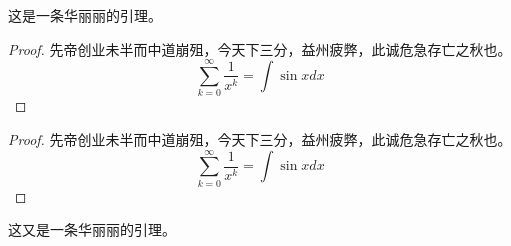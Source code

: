 \begin{lemma}
  这是一条华丽丽的引理。
\end{lemma}

\begin{proof}
先帝创业未半而中道崩殂，今天下三分，益州疲弊，此诚危急存亡之秋也。
\begin{equation}
  \sum_{k=0}^{\infty} \frac{1}{x^k} = \int \sin x dx
\end{equation}
\end{proof}

\begin{proof}
先帝创业未半而中道崩殂，今天下三分，益州疲弊，此诚危急存亡之秋也。
\begin{equation*}
  \sum_{k=0}^{\infty} \frac{1}{x^k} = \int \sin x dx
\end{equation*}
\end{proof}

\begin{lemma}
  这又是一条华丽丽的引理。
\end{lemma}




